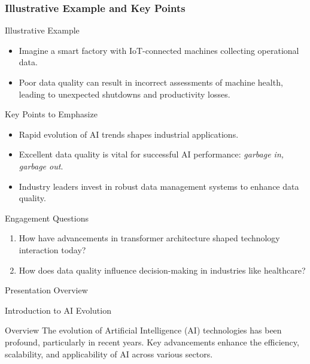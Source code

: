 \documentclass[aspectratio=169]{beamer}
\begin{document}
\begin{frame}[fragile]
    \frametitle{Illustrative Example and Key Points}
    
    \begin{block}{Illustrative Example}
        \begin{itemize}
            \item Imagine a smart factory with IoT-connected machines collecting operational data.
            \item Poor data quality can result in incorrect assessments of machine health, leading to unexpected shutdowns and productivity losses.
        \end{itemize}
    \end{block}
    
    \begin{block}{Key Points to Emphasize}
        \begin{itemize}
            \item Rapid evolution of AI trends shapes industrial applications.
            \item Excellent data quality is vital for successful AI performance: \textit{garbage in, garbage out}.
            \item Industry leaders invest in robust data management systems to enhance data quality.
        \end{itemize}
    \end{block}

    \begin{block}{Engagement Questions}
        \begin{enumerate}
            \item How have advancements in transformer architecture shaped technology interaction today?
            \item How does data quality influence decision-making in industries like healthcare?
        \end{enumerate}
    \end{block}
\end{frame}

\begin{frame}[fragile]{Presentation Overview}
  \tableofcontents[hideallsubsections]
\end{frame}

\begin{frame}[fragile]{Introduction to AI Evolution}
    \begin{block}{Overview}
        The evolution of Artificial Intelligence (AI) technologies has been profound, particularly in recent years. Key advancements enhance the efficiency, scalability, and applicability of AI across various sectors.
    \end{block}
\end{frame}
\end{document}
